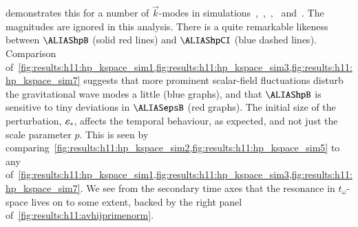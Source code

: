      demonstrates this for a number of $\vec{k}$-modes in simulations~,~,~,~ and~. The magnitudes are ignored in this analysis. There is a quite remarkable likeness between $\hpB$ (solid red lines) and $\hpCI$ (blue dashed lines). Comparison of~\cref{fig:results:h11:hp_kspace_sim1,fig:results:h11:hp_kspace_sim3,fig:results:h11:hp_kspace_sim7} suggests that more prominent scalar-field fluctuations disturb the gravitational wave modes a little (blue graphs), and that $\hpB$ is sensitive to tiny deviations in $\epsB$ (red graphs). %
    The initial size of the perturbation, $\varepsilon_\ast$, affects the temporal behaviour, as expected, and not just the scale parameter $p$. This is seen by comparing~\cref{fig:results:h11:hp_kspace_sim2,fig:results:h11:hp_kspace_sim5} to any of~\cref{fig:results:h11:hp_kspace_sim1,fig:results:h11:hp_kspace_sim3,fig:results:h11:hp_kspace_sim7}. We see from the secondary time axes that the resonance in $t_\omega$-space lives on to some extent, backed by the right panel of~\cref{fig:results:h11:avhijprimenorm}. %


